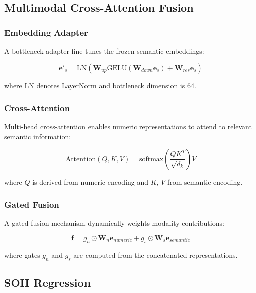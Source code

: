 \documentclass[conference]{IEEEtran}
\begin{document}
\subsection{Multimodal Cross-Attention Fusion}

\subsubsection{Embedding Adapter}

A bottleneck adapter fine-tunes the frozen semantic embeddings:

\begin{equation}
    \mathbf{e}'_s = \text{LN}(\mathbf{W}_{up} \text{GELU}(\mathbf{W}_{down} \mathbf{e}_s) + \mathbf{W}_{res} \mathbf{e}_s)
\end{equation}

where LN denotes LayerNorm and bottleneck dimension is 64.

\subsubsection{Cross-Attention}

Multi-head cross-attention enables numeric representations to attend to relevant semantic information:

\begin{equation}
    \text{Attention}(Q, K, V) = \text{softmax}\left(\frac{QK^T}{\sqrt{d_k}}\right)V
\end{equation}

where $Q$ is derived from numeric encoding and $K$, $V$ from semantic encoding.

\subsubsection{Gated Fusion}

A gated fusion mechanism dynamically weights modality contributions:

\begin{equation}
    \mathbf{f} = g_n \odot \mathbf{W}_n \mathbf{e}_{numeric} + g_s \odot \mathbf{W}_s \mathbf{e}_{semantic}
\end{equation}

where gates $g_n$ and $g_s$ are computed from the concatenated representations.

\subsection{SOH Regression}
\end{document}
